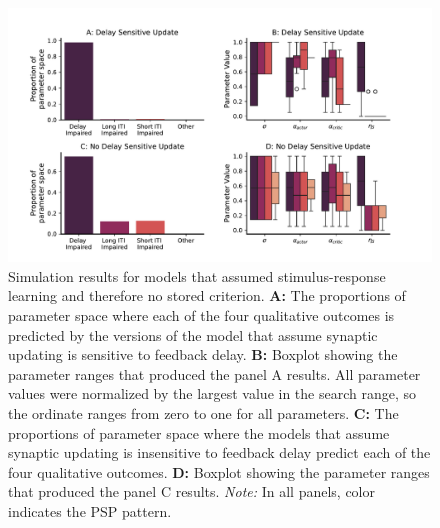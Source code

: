 \documentclass[doc, floatsintext]{apa7}
\begin{document}
\begin{figure} 
  \centering
  \includegraphics[width=1\textwidth]{../figures/model_new_class_I_no_stored_criterion.pdf}
  \caption{ Simulation results for models that assumed
      stimulus-response learning and therefore no stored
      criterion.  
      \textbf{A:} The proportions of parameter space where
      each of the four qualitative outcomes is predicted by
      the versions of the model that assume synaptic
      updating is sensitive to feedback delay.
      \textbf{B:} Boxplot showing the parameter ranges that
      produced the panel A results.     All parameter values
      were normalized by the largest value in the search
      range, so the ordinate ranges from zero to one for all
      parameters.
      \textbf{C:} The proportions of parameter space where
      the models that assume synaptic updating is
      insensitive to feedback delay predict each of the four
      qualitative outcomes. 
      \textbf{D:} Boxplot showing the parameter ranges that
      produced the panel C results.     
      \textit{Note:} In all panels, color indicates the PSP
      pattern.
}
  \label{fig:RL_results}
\end{figure}
\end{document}
